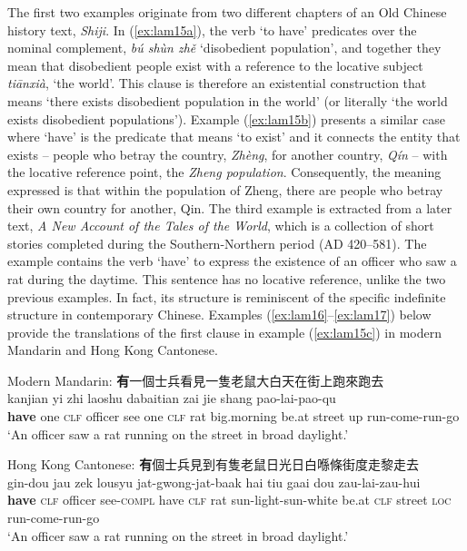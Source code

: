 \documentclass[output=paper,colorlinks,citecolor=brown,chinesefont]{langscibook}
\begin{document}
The first two examples originate from two different chapters of an Old Chinese history text, \emph{Shiji}. In (\ref{ex:lam15a}), the verb `to have' predicates over the nominal complement, \textit{bú shùn zhě} `disobedient population', and together they mean that disobedient people exist  with a reference to the locative subject \textit{tiānxià}, `the world'. This clause is therefore an existential construction that means `there exists disobedient population in the world' (or literally `the world exists disobedient populations'). Example (\ref{ex:lam15b}) presents a similar case where `have' is the predicate that means `to exist' and it connects the entity that exists – people who betray the country, \emph{Zhèng}, for another country, \emph{Qín} – with the locative reference point, the \emph{Zheng population}. Consequently, the meaning expressed is that within the population of Zheng, there are people who betray their own country for another, Qin. The third example is extracted from a later text, \emph{A New Account of the Tales of the World}, which is a collection of short stories completed during the Southern-Northern period (AD 420–581). The example contains the verb `have' to express the existence of an officer who saw a rat during the daytime. This sentence has no locative reference, unlike the two previous examples. In fact, its structure is reminiscent of the specific indefinite structure in contemporary Chinese. Examples (\ref{ex:lam16}--\ref{ex:lam17}) below provide the translations of the first clause in example (\ref{ex:lam15c}) in modern Mandarin and Hong Kong Cantonese. 

\ea Modern Mandarin: {\cn \textbf{有}一個士兵看見一隻老鼠大白天在街上跑來跑去} \label{ex:lam16}\\
   kanjian yi zhi laoshu dabaitian zai jie shang pao-lai-pao-qu\\
 \textbf{have} one \textsc{clf} officer see one \textsc{clf} rat big.morning be.at street	up run-come-run-go\\
  \glt `An officer saw a rat running on the street in broad daylight.'
\z 

\ea Hong Kong Cantonese: {\cn \textbf{有}個士兵見到有隻老鼠日光日白喺條街度走黎走去}\label{ex:lam17}\\
   gin-dou jau zek lousyu jat-gwong-jat-baak hai	tiu gaai dou zau-lai-zau-hui\\
	\textbf{have} \textsc{clf} officer see-\textsc{compl} have \textsc{clf} rat sun-light-sun-white be.at \textsc{clf} street \textsc{loc} run-come-run-go\\
	\glt `An officer saw a rat running on the street in broad daylight.'
\z 
\end{document}
